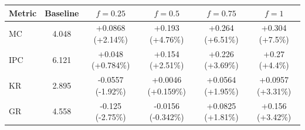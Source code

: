 \begin{tabular}{lccccc}
\toprule
Metric & Baseline & $f=0.25$ & $f=0.5$ & $f=0.75$ & $f=1$ \\
\midrule
MC & 4.048 & +0.0868 (+2.14\%) & +0.193 (+4.76\%) & +0.264 (+6.51\%) & +0.304 (+7.5\%) \\
IPC & 6.121 & +0.048 (+0.784\%) & +0.154 (+2.51\%) & +0.226 (+3.69\%) & +0.27 (+4.4\%) \\
KR & 2.895 & -0.0557 (-1.92\%) & +0.0046 (+0.159\%) & +0.0564 (+1.95\%) & +0.0957 (+3.31\%) \\
GR & 4.558 & -0.125 (-2.75\%) & -0.0156 (-0.342\%) & +0.0825 (+1.81\%) & +0.156 (+3.42\%) \\
\bottomrule
\end{tabular}
